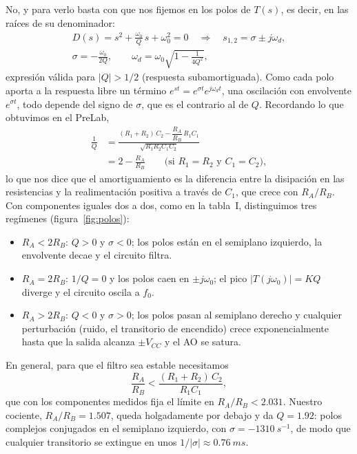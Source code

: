 \documentclass[a4paper,11pt]{article}
\begin{document}
No, y para verlo basta con que nos fijemos en los polos de $T(s)$, es decir, en las raíces de su denominador:
\begin{equation}
\begin{gathered}
  D(s)=s^2+\frac{\omega_0}{Q}\,s+\omega_0^2=0
  \quad\Longrightarrow\quad
  s_{1,2}=\sigma\pm j\omega_d ,\\
  \sigma=-\frac{\omega_0}{2Q},\qquad
  \omega_d=\omega_0\sqrt{1-\frac{1}{4Q^2}},
\end{gathered}
  \label{eq:polos}
\end{equation}
expresión válida para $|Q|>1/2$ (respuesta subamortiguada). Como cada polo aporta a la respuesta libre un término $e^{st}=e^{\sigma t}e^{j\omega_d t}$, una oscilación con envolvente $e^{\sigma t}$, todo depende del signo de $\sigma$, que es el contrario al de $Q$. Recordando lo que obtuvimos en el PreLab,
\begin{equation}
\begin{aligned}
  \frac{1}{Q}&=\frac{(R_1+R_2)\,C_2-\dfrac{R_A}{R_B}\,R_1C_1}{\sqrt{R_1R_2C_1C_2}}\\[4pt]
  &=2-\frac{R_A}{R_B}\qquad\text{(si $R_1=R_2$ y $C_1=C_2$)},
\end{aligned}
  \label{eq:Qsimple}
\end{equation}
lo que nos dice que el amortiguamiento es la diferencia entre la disipación en las resistencias y la realimentación positiva a través de $C_1$, que crece con $R_A/R_B$. Con componentes iguales dos a dos, como en la tabla~I, distinguimos tres regímenes (figura~\ref{fig:polos}):
\begin{itemize}
  \item $R_A<2R_B$: $Q>0$ y $\sigma<0$; los polos están en el semiplano izquierdo, la envolvente decae y el circuito filtra.
  \item $R_A=2R_B$: $1/Q=0$ y los polos caen en $\pm j\omega_0$; el pico $|T(j\omega_0)|=KQ$ diverge y el circuito oscila a $f_0$.
  \item $R_A>2R_B$: $Q<0$ y $\sigma>0$; los polos pasan al semiplano derecho y cualquier perturbación (ruido, el transitorio de encendido) crece exponencialmente hasta que la salida alcanza $\pm V_{CC}$ y el AO se satura.
\end{itemize}
En general, para que el filtro sea estable necesitamos
\begin{equation}
  \frac{R_A}{R_B}<\frac{(R_1+R_2)\,C_2}{R_1C_1},
\end{equation}
que con los componentes medidos fija el límite en $R_A/R_B<\num{2.031}$. Nuestro cociente, $R_A/R_B=\num{1.507}$, queda holgadamente por debajo y da $Q=\num{1.92}$: polos complejos conjugados en el semiplano izquierdo, con $\sigma=-\qty{1310}{s^{-1}}$, de modo que cualquier transitorio se extingue en unos $1/|\sigma|\approx\qty{0.76}{ms}$.
\end{document}
